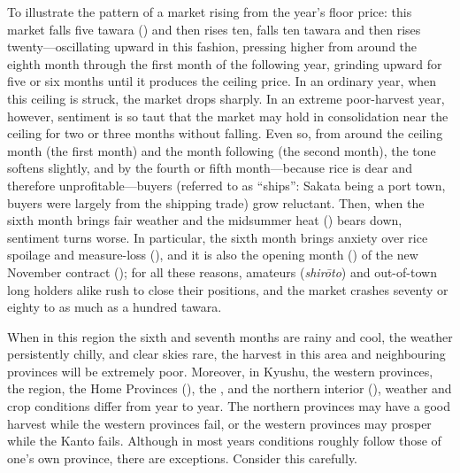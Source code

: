To illustrate the pattern of a market rising from the year's floor
price: this market falls five tawara () and then rises
ten, falls ten tawara and then rises twenty---oscillating upward in this
fashion, pressing higher from around the eighth month through the first
month of the following year, grinding upward for five or six months until
it produces the ceiling price. In an ordinary year, when this ceiling is
struck, the market drops sharply. In an extreme poor-harvest year,
however, sentiment is so taut that the market may hold in consolidation
near the ceiling for two or three months without falling. Even so, from
around the ceiling month (the first month) and the month following (the
second month), the tone softens slightly, and by the fourth or fifth
month---because rice is dear and therefore unprofitable---buyers
(referred to as ``ships'': Sakata being a port town, buyers were largely
from the shipping trade) grow reluctant. Then, when the sixth month
brings fair weather and the midsummer heat () bears
down, sentiment turns worse. In particular, the sixth month brings anxiety over
rice spoilage and measure-loss (), and it is also
the opening month () of the new November contract
(); for all these reasons, amateurs (\textit{shir\=oto})
and out-of-town long holders alike rush to close their positions, and the
market crashes seventy or eighty to as much as a hundred tawara.


\begin{sokyubox}
{\small\itshape\color{sokyubar} }

\medskip
When in this region the sixth and seventh months are rainy and cool, the
weather persistently chilly, and clear skies rare, the harvest in this
area and neighbouring provinces will be extremely poor. Moreover, in
Kyushu, the western provinces, the  region, the Home Provinces
(), the , and the northern interior
(), weather and crop conditions differ from year to
year. The northern provinces may have a good harvest while the western
provinces fail, or the western provinces may prosper while the Kanto
fails. Although in most years conditions roughly follow those of one's
own province, there are exceptions. Consider this carefully.
\end{sokyubox}


